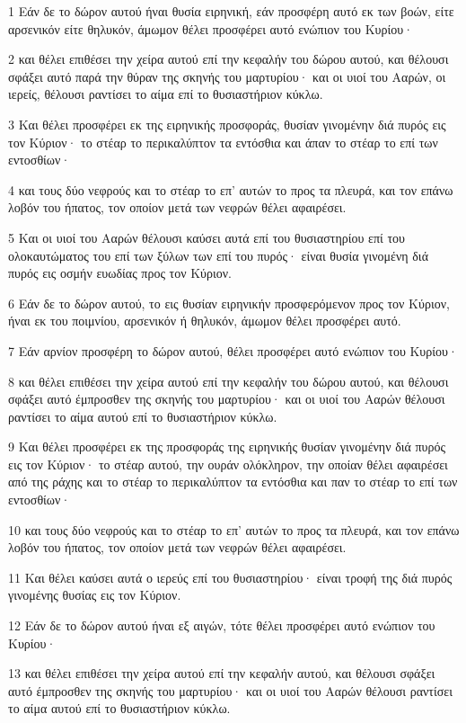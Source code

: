 \par 1 Εάν δε το δώρον αυτού ήναι θυσία ειρηνική, εάν προσφέρη αυτό εκ των βοών, είτε αρσενικόν είτε θηλυκόν, άμωμον θέλει προσφέρει αυτό ενώπιον του Κυρίου·
\par 2 και θέλει επιθέσει την χείρα αυτού επί την κεφαλήν του δώρου αυτού, και θέλουσι σφάξει αυτό παρά την θύραν της σκηνής του μαρτυρίου· και οι υιοί του Ααρών, οι ιερείς, θέλουσι ραντίσει το αίμα επί το θυσιαστήριον κύκλω.
\par 3 Και θέλει προσφέρει εκ της ειρηνικής προσφοράς, θυσίαν γινομένην διά πυρός εις τον Κύριον· το στέαρ το περικαλύπτον τα εντόσθια και άπαν το στέαρ το επί των εντοσθίων·
\par 4 και τους δύο νεφρούς και το στέαρ το επ' αυτών το προς τα πλευρά, και τον επάνω λοβόν του ήπατος, τον οποίον μετά των νεφρών θέλει αφαιρέσει.
\par 5 Και οι υιοί του Ααρών θέλουσι καύσει αυτά επί του θυσιαστηρίου επί του ολοκαυτώματος του επί των ξύλων των επί του πυρός· είναι θυσία γινομένη διά πυρός εις οσμήν ευωδίας προς τον Κύριον.
\par 6 Εάν δε το δώρον αυτού, το εις θυσίαν ειρηνικήν προσφερόμενον προς τον Κύριον, ήναι εκ του ποιμνίου, αρσενικόν ή θηλυκόν, άμωμον θέλει προσφέρει αυτό.
\par 7 Εάν αρνίον προσφέρη το δώρον αυτού, θέλει προσφέρει αυτό ενώπιον του Κυρίου·
\par 8 και θέλει επιθέσει την χείρα αυτού επί την κεφαλήν του δώρου αυτού, και θέλουσι σφάξει αυτό έμπροσθεν της σκηνής του μαρτυρίου· και οι υιοί του Ααρών θέλουσι ραντίσει το αίμα αυτού επί το θυσιαστήριον κύκλω.
\par 9 Και θέλει προσφέρει εκ της προσφοράς της ειρηνικής θυσίαν γινομένην διά πυρός εις τον Κύριον· το στέαρ αυτού, την ουράν ολόκληρον, την οποίαν θέλει αφαιρέσει από της ράχης και το στέαρ το περικαλύπτον τα εντόσθια και παν το στέαρ το επί των εντοσθίων·
\par 10 και τους δύο νεφρούς και το στέαρ το επ' αυτών το προς τα πλευρά, και τον επάνω λοβόν του ήπατος, τον οποίον μετά των νεφρών θέλει αφαιρέσει.
\par 11 Και θέλει καύσει αυτά ο ιερεύς επί του θυσιαστηρίου· είναι τροφή της διά πυρός γινομένης θυσίας εις τον Κύριον.
\par 12 Εάν δε το δώρον αυτού ήναι εξ αιγών, τότε θέλει προσφέρει αυτό ενώπιον του Κυρίου·
\par 13 και θέλει επιθέσει την χείρα αυτού επί την κεφαλήν αυτού, και θέλουσι σφάξει αυτό έμπροσθεν της σκηνής του μαρτυρίου· και οι υιοί του Ααρών θέλουσι ραντίσει το αίμα αυτού επί το θυσιαστήριον κύκλω.
